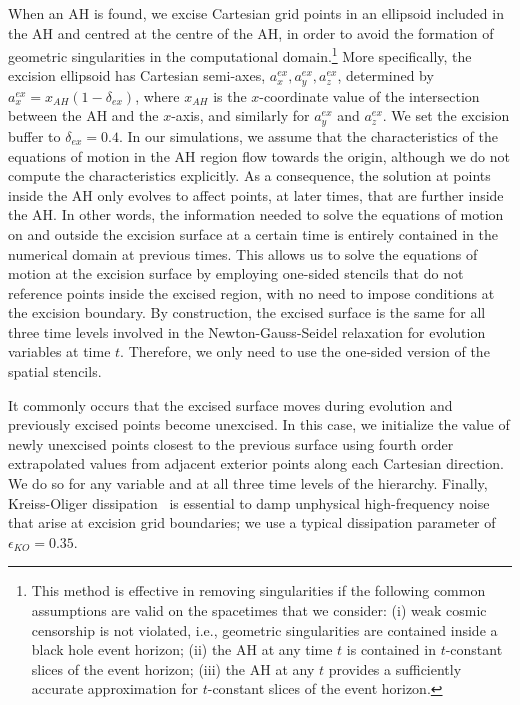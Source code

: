 \documentclass[aps,letterpaper,twocolumn,nofootinbib]{revtex4}
\numberwithin{equation}{section}
\begin{document}
When an AH is found, we excise Cartesian grid points in an ellipsoid included in the AH and centred at the centre of the AH, in order to avoid the formation of geometric singularities in the computational domain.\footnote{This method is effective in removing singularities if the following common assumptions are valid on the spacetimes that we consider: (i) weak cosmic censorship is not violated, i.e., geometric singularities are contained inside a black hole event horizon; (ii) the AH at any time $t$ is contained in $t$-constant slices of the event horizon; (iii) the AH at any $t$ provides a sufficiently accurate approximation for $t$-constant slices of the event horizon.}
More specifically, the excision ellipsoid has Cartesian semi-axes, $a_x^{ex},a_y^{ex},a_z^{ex}$, determined by $a_x^{ex}=x_{AH}(1-\delta_{ex})$, where $x_{AH}$ is the $x$-coordinate value of the intersection between the AH and the $x$-axis, and similarly for $a_y^{ex}$ and $a_z^{ex}$. We set the excision buffer to $\delta_{ex}=0.4$. 
In our simulations, we assume that the characteristics of the equations of motion in the AH region flow towards the origin, although we do not compute the characteristics explicitly. As a consequence, the solution at points inside the AH only evolves to affect points, at later times, that are further inside the AH. In other words, the information needed to solve the equations of motion on and outside the excision surface at a certain time is entirely contained in the numerical domain at previous times. This allows us to solve the equations of motion at the excision surface by employing one-sided stencils that do not reference points inside the excised region, with no need to impose conditions at the excision boundary. By construction, the excised surface is the same for all three time levels involved in the Newton-Gauss-Seidel relaxation for evolution variables at time $t$. Therefore, we only need to use the one-sided version of the spatial stencils. 

It commonly occurs that the excised surface moves during evolution and previously excised points become unexcised. In this case, we initialize the value of newly unexcised points closest to the previous surface using fourth order extrapolated values from adjacent exterior points along each Cartesian direction. We do so for any variable and at all three time levels of the hierarchy.
Finally, Kreiss-Oliger dissipation~\cite{kreiss1973methods} is essential to damp unphysical high-frequency noise that arise at excision grid boundaries; we use a typical dissipation parameter of $\epsilon_{KO}=0.35$.
\end{document}

